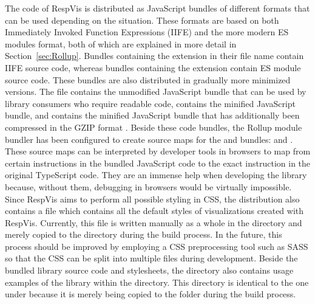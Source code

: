 The code of RespVis is distributed as JavaScript bundles of different formats that can be used depending on the situation.
These formats are based on both Immediately Invoked Function Expressions (IIFE) and the more modern ES modules format, both of which are explained in more detail in Section~\ref{sec:Rollup}.
Bundles containing the  extension in their file name contain IIFE source code, whereas bundles containing the  extension contain ES module source code.  
These bundles are also distributed in gradually more minimized versions.
The  file contains the unmodified JavaScript bundle that can be used by library consumers who require readable code,  contains the minified JavaScript bundle, and  contains the minified JavaScript bundle that has additionally been compressed in the GZIP format \parencite{GZIP}.
Beside these code bundles, the Rollup module bundler has been configured to create source maps for the  and  bundles:  and .
These source maps can be interpreted by developer tools in browsers to map from certain instructions in the bundled JavaScript code to the exact instruction in the original TypeScript code.
They are an immense help when developing the library because, without them, debugging in browsers would be virtually impossible.
Since RespVis aims to perform all possible styling in CSS, the distribution also contains a  file which contains all the default styles of visualizations created with RespVis. 
Currently, this file is written manually as a whole in the  directory and merely copied to the  directory during the build process.
In the future, this process should be improved by employing a CSS preprocessing tool such as SASS \parencite{SASS} so that the CSS can be split into multiple files during development.
Beside the bundled library source code and stylesheets, the  directory also contains usage examples of the library within the  directory.
This directory is identical to the one under  because it is merely being copied to the  folder during the build process.




